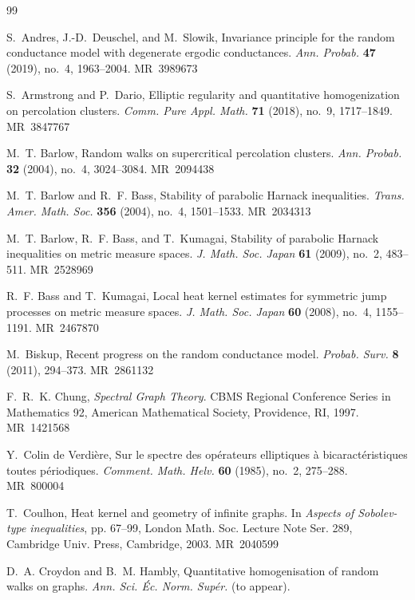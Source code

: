 \documentclass[reqno]{amsart}
\providecommand{\MR}[1]{\textsc{MR}~#1}
\numberwithin{equation}{section}
\theoremstyle{definition}
\theoremstyle{remark}
\begin{document}
\begin{thebibliography}{99}

S.~Andres, J.-D.~Deuschel, and M.~Slowik, Invariance principle for the random conductance model with degenerate ergodic conductances.
\emph{Ann. Probab.} \textbf{47} (2019), no.~4, 1963--2004.
\MR{3989673}

S.~Armstrong and P.~Dario, Elliptic regularity and quantitative homogenization on percolation clusters.
\emph{Comm. Pure Appl. Math.} \textbf{71} (2018), no.~9, 1717--1849.
\MR{3847767}

M.~T. Barlow, Random walks on supercritical percolation clusters.
\emph{Ann. Probab.} \textbf{32} (2004), no.~4, 3024--3084.
\MR{2094438}

M.~T. Barlow and R.~F. Bass, Stability of parabolic Harnack inequalities.
\emph{Trans. Amer. Math. Soc.} \textbf{356} (2004), no.~4, 1501--1533.
\MR{2034313}

M.~T. Barlow, R.~F. Bass, and T.~Kumagai, Stability of parabolic Harnack inequalities on metric measure spaces.
\emph{J. Math. Soc. Japan} \textbf{61} (2009), no.~2, 483--511.
\MR{2528969}

R.~F. Bass and T.~Kumagai, Local heat kernel estimates for symmetric jump processes on metric measure spaces.
\emph{J. Math. Soc. Japan} \textbf{60} (2008), no.~4, 1155--1191.
\MR{2467870}

M.~Biskup, Recent progress on the random conductance model.
\emph{Probab. Surv.} \textbf{8} (2011), 294--373.
\MR{2861132}

F.~R.~K. Chung, \emph{Spectral Graph Theory}.
CBMS Regional Conference Series in Mathematics 92, American Mathematical Society, Providence, RI, 1997.
\MR{1421568}

Y.~Colin de Verdière, Sur le spectre des opérateurs elliptiques à bicaractéristiques toutes périodiques.
\emph{Comment. Math. Helv.} \textbf{60} (1985), no.~2, 275--288.
\MR{800004}

T.~Coulhon, Heat kernel and geometry of infinite graphs.
In \emph{Aspects of Sobolev-type inequalities},
pp. 67--99, London Math. Soc. Lecture Note Ser. 289,
Cambridge Univ. Press, Cambridge, 2003.
\MR{2040599}

D.~A. Croydon and B.~M. Hambly, Quantitative homogenisation of random walks on graphs.
\emph{Ann. Sci. Éc. Norm. Supér.} (to appear).


\end{thebibliography}
\end{document}
